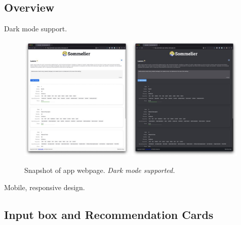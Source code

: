 \documentclass[
	a4paper,
	fontsize=10pt, %
	twoside=false, %
	secnumdepth=2, %
]{kaohandt}
\begin{document}
\subsection{Overview}

Dark mode support.

\begin{figure}[h]
	\includegraphics[width=0.49\textwidth]{sommelier-view-01.jpg}
	\includegraphics[width=0.49\textwidth]{sommelier-view-02.jpg}
	\caption{Snapshot of app webpage. \emph{Dark mode supported.}}
	\label{fig:app_overview}
\end{figure}

Mobile, responsive design.

\subsection{Input box and Recommendation Cards}
\end{document}
